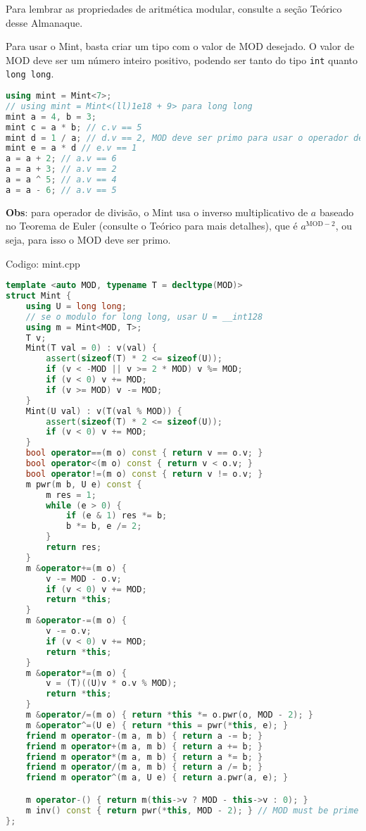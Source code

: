 \documentclass[10pt, a4paper, oneside]{book}
\begin{document}
Para lembrar as propriedades de aritmética modular, consulte a seção Teórico desse Almanaque.



Para usar o Mint, basta criar um tipo com o valor de $\text{MOD}$ desejado. O valor de $\text{MOD}$ deve ser um número inteiro positivo, podendo ser tanto do tipo \texttt{int} quanto \texttt{long long}.



\begin{lstlisting}[language=C++]
using mint = Mint<7>;
// using mint = Mint<(ll)1e18 + 9> para long long
mint a = 4, b = 3;
mint c = a * b; // c.v == 5
mint d = 1 / a; // d.v == 2, MOD deve ser primo para usar o operador de divisão
mint e = a * d // e.v == 1
a = a + 2; // a.v == 6
a = a + 3; // a.v == 2
a = a ^ 5; // a.v == 4
a = a - 6; // a.v == 5
\end{lstlisting}



\textbf{Obs}: para operador de divisão, o Mint usa o inverso multiplicativo de $a$ baseado no Teorema de Euler (consulte o Teórico para mais detalhes), que é $a^{\text{MOD}-2}$, ou seja, para isso o $\text{MOD}$ deve ser primo.

\hfill

Codigo: mint.cpp

\begin{lstlisting}[language=C++]
template <auto MOD, typename T = decltype(MOD)>
struct Mint {
    using U = long long;
    // se o modulo for long long, usar U = __int128
    using m = Mint<MOD, T>;
    T v;
    Mint(T val = 0) : v(val) {
        assert(sizeof(T) * 2 <= sizeof(U));
        if (v < -MOD || v >= 2 * MOD) v %= MOD;
        if (v < 0) v += MOD;
        if (v >= MOD) v -= MOD;
    }
    Mint(U val) : v(T(val % MOD)) {
        assert(sizeof(T) * 2 <= sizeof(U));
        if (v < 0) v += MOD;
    }
    bool operator==(m o) const { return v == o.v; }
    bool operator<(m o) const { return v < o.v; }
    bool operator!=(m o) const { return v != o.v; }
    m pwr(m b, U e) const {
        m res = 1;
        while (e > 0) {
            if (e & 1) res *= b;
            b *= b, e /= 2;
        }
        return res;
    }
    m &operator+=(m o) {
        v -= MOD - o.v;
        if (v < 0) v += MOD;
        return *this;
    }
    m &operator-=(m o) {
        v -= o.v;
        if (v < 0) v += MOD;
        return *this;
    }
    m &operator*=(m o) {
        v = (T)((U)v * o.v % MOD);
        return *this;
    }
    m &operator/=(m o) { return *this *= o.pwr(o, MOD - 2); }
    m &operator^=(U e) { return *this = pwr(*this, e); }
    friend m operator-(m a, m b) { return a -= b; }
    friend m operator+(m a, m b) { return a += b; }
    friend m operator*(m a, m b) { return a *= b; }
    friend m operator/(m a, m b) { return a /= b; }
    friend m operator^(m a, U e) { return a.pwr(a, e); }

    m operator-() { return m(this->v ? MOD - this->v : 0); }
    m inv() const { return pwr(*this, MOD - 2); } // MOD must be prime
};
\end{lstlisting}
\hfill
\end{document}

